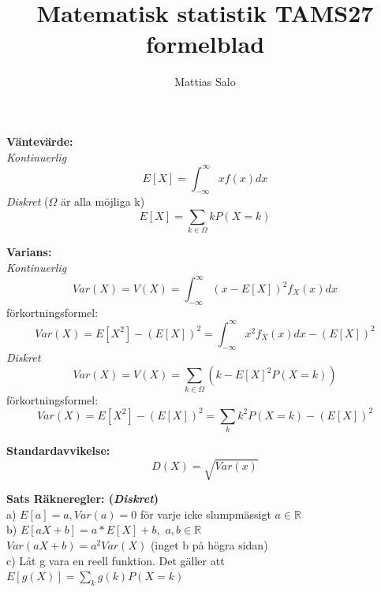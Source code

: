\documentclass[8pt]{extarticle}
\title{Matematisk statistik TAMS27 formelblad}
\author{Mattias Salo}
\begin{document}
\maketitle
\begin{multicols*}{2}


\textbf{Väntevärde:}\\
\textit{Kontinuerlig}
\begin{equation*}
E[X] = \int_{-\infty}^{\infty} xf(x) dx
\end{equation*}
\textit{Diskret} ($\Omega$ är alla möjliga k)
\begin{equation*}
E[X] = \sum_{k \in \Omega} kP(X = k)
\end{equation*}

\textbf{Varians:}\\
\textit{Kontinuerlig}
\begin{equation*}
Var(X) = V(X) = \int_{-\infty}^{\infty} (x - E[X])^2 f_X(x)dx
\end{equation*}
förkortningsformel:
\begin{equation*}
Var(X) = E[X^2] - (E[X])^2 = \int_{-\infty}^{\infty} x^2 f_X(x)dx - (E[X])^2
\end{equation*}
\textit{Diskret}
\begin{equation*}
Var(X) = V(X) = \sum_{k \in \Omega} (k - E[X]^2P(X = k))
\end{equation*}
förkortningsformel:
\begin{equation*}
Var(X) = E[X^2] - (E[X])^2 = \sum_k k^2P(X=k) - (E[X])^2
\end{equation*}

\textbf{Standardavvikelse:}\\
\begin{equation*}
D(X) = \sqrt{Var(x)}
\end{equation*}

\textbf{Sats Räkneregler: (\textit{Diskret})}\\
a) $ E[a] = a, Var(a) = 0$ för varje icke slumpmässigt $a\in \mathbb{R}$\\
b) $E[aX + b] = a * E[X] + b ,$   $a, b \in \mathbb{R}$\\
$Var(aX + b) = a^2Var(X)$ (inget b på högra sidan)\\
c) Låt g vara en reell funktion. Det gäller att $E[g(X)] = \sum_k g(k)P(X = k)$\\


\end{multicols*}
\end{document}
